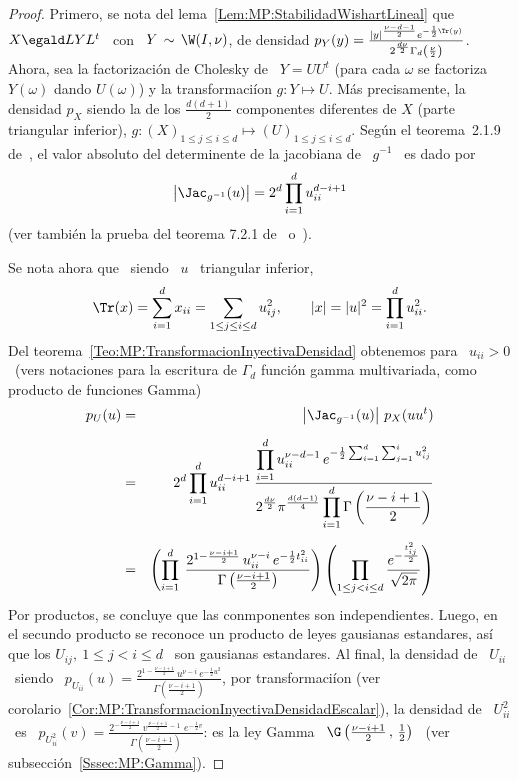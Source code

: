 \begin{proof}
  Primero, se nota del lema~\ref{Lem:MP:StabilidadWishartLineal} que \ $X \egald
  L  Y  L^t$  \  con  \  $Y  \, \sim  \,  \W(I,\nu)$,  de  densidad  $p_Y(y)  =
  \frac{|y|^{\frac{\nu-d-1}{2}}    e^{-\frac12    \Tr(y)}}{2^{\frac{d   \nu}{2}}
    \Gamma_d\left(  \frac{\nu}{2} \right)}$.  Ahora, sea  la  factorizaci\'on de
  Cholesky de  \ $Y =  U U^t$ (\ie  para cada $\omega$ se  factoriza $Y(\omega)$
  dando  $U(\omega)$)   y  la  transformaci\'ion   $g:  Y  \mapsto   U$.   M\'as
  precisamente,  la  densidad  $p_X$   siendo  la  de  los  $\frac{d  (d+1)}{2}$
  componentes diferentes  de $X$ (parte  triangular inferior), $g: (X)_{1  \le j
    \le i \le d} \mapsto (U)_{1 \le  j \le i \le d}$.
  Seg\'un el  teorema~2.1.9 de~\cite{Mui82}, el valor  absoluto del determinente
  de la jacobiana de \ $g^{-1}$ \ es dado por
  \[
  \left| \Jac_{g^{-1}}(u) \right| = 2^d \prod_{i=1}^d u_{ii}^{d-i+1}
  \]
  (ver tambi\'en la prueba del teorema 7.2.1 de~\cite{And03} o~\cite[Prop.~2.22]{BilBre99}).
  
  Se nota ahora que \ siendo \ $u$ \ triangular inferior,
  \[
  \Tr(x) =  \sum_{i=1}^d x_{ii}  = \sum_{1 \le j \le i \le d} u_{ij}^2, \qquad
  |x| = |u|^2 = \prod_{i=1}^d u_{ii}^2.
  \]
  Del  teorema~\ref{Teo:MP:TransformacionInyectivaDensidad}   obtenemos  para  \
  $u_{ii}  > 0$ \  (vers notaciones  para la  escritura de  $\Gamma_d$ funci\'on
  gamma multivariada, como producto de funciones Gamma)
  \begin{eqnarray*}
  p_U(u) & = &\left| \Jac_{g^{-1}}(u) \right| \,  p_X(u u^t) \\[2mm]
  & = & 2^d \prod_{i=1}^d u_{ii}^{d-i+1} \: \frac{\displaystyle \prod_{i=1}^d
  u_{ii}^{\nu-d-1} \, e^{ -\frac12 \sum_{i=1}^d \sum_{j=1}^i  u_{ij}^2}}{\displaystyle
  2^{\frac{d \nu}{2}} \pi^{\frac{d (d-1)}{4}} \prod_{i=1}^d \Gamma\left(
  \frac{\nu-i+1}{2} \right)}\\[2mm]
  & = & \left( \prod_{i=1}^d \: \frac{2^{1 - \frac{\nu-i+1}{2}} \,
  u_{ii}^{\nu-i} \, e^{-\frac12 t_{ii}^2}}{\Gamma\left( \frac{\nu-i+1}{2} \right)}
  \right) \left( \prod_{1 \le j < i \le d} \frac{\displaystyle
  e^{-\frac{t_{ij}^2}{2}}}{\sqrt{2 \pi}} \right)
  \end{eqnarray*}
  Por productos, se concluye que  las conmponentes son independientes. Luego, en
  el secundo  producto se  reconoce un producto  de leyes  gausianas estandares,
  as\'i que los  $U_{ij}, \: 1 \le j  < i \le d$ \ son  gausianas estandares. Al
  final,   la   densidad  de   \   $U_{ii}$   \   siendo  \   $p_{U_{ii}}(u)   =
  \frac{2^{1-\frac{\nu-i+1}{2}}  \, u^{\nu-i} \,  e^{-\frac12 u^2}}{\Gamma\left(
      \frac{\nu-i+1}{2}      \right)}$,      por     transformaci\'ion      (ver
  corolario~\ref{Cor:MP:TransformacionInyectivaDensidadEscalar}), la densidad de
  \  $U_{ii}^2$  \  es  \  $p_{U_{ii}^2}(v)  =  \frac{2^{-\frac{\nu-i+1}{2}}  \,
    v^{\frac{\nu-i+1}{2}-1} \, \, e^{-\frac12 v}}{\Gamma\left( \frac{\nu-i+1}{2}
    \right)}$: es  la ley  Gamma \ $\G\left(  \frac{\nu-i+1}{2} \, ,  \, \frac12
  \right)$ \ (ver subsecci\'on~\ref{Sssec:MP:Gamma}).
\end{proof}
